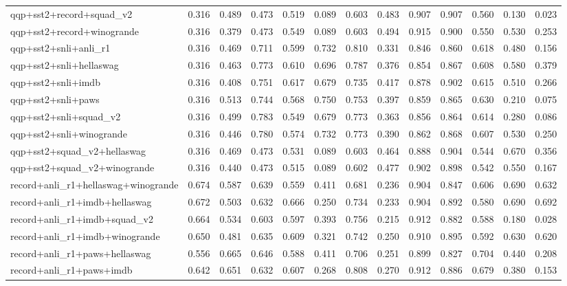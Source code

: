 \begin{table}[t]
\begin{tabular}{lrrrrrrrrrrrr}
    qqp+sst2+record+squad\_v2 & 0.316 & 0.489 & 0.473 & 0.519 & 0.089 & 0.603 & 0.483 & 0.907 & 0.907 & 0.560 & 0.130 & 0.023 \\
    qqp+sst2+record+winogrande & 0.316 & 0.379 & 0.473 & 0.549 & 0.089 & 0.603 & 0.494 & 0.915 & 0.900 & 0.550 & 0.530 & 0.253 \\
    qqp+sst2+snli+anli\_r1 & 0.316 & 0.469 & 0.711 & 0.599 & 0.732 & 0.810 & 0.331 & 0.846 & 0.860 & 0.618 & 0.480 & 0.156 \\
    qqp+sst2+snli+hellaswag & 0.316 & 0.463 & 0.773 & 0.610 & 0.696 & 0.787 & 0.376 & 0.854 & 0.867 & 0.608 & 0.580 & 0.379 \\
    qqp+sst2+snli+imdb & 0.316 & 0.408 & 0.751 & 0.617 & 0.679 & 0.735 & 0.417 & 0.878 & 0.902 & 0.615 & 0.510 & 0.266 \\
    qqp+sst2+snli+paws & 0.316 & 0.513 & 0.744 & 0.568 & 0.750 & 0.753 & 0.397 & 0.859 & 0.865 & 0.630 & 0.210 & 0.075 \\
    qqp+sst2+snli+squad\_v2 & 0.316 & 0.499 & 0.783 & 0.549 & 0.679 & 0.773 & 0.363 & 0.856 & 0.864 & 0.614 & 0.280 & 0.086 \\
    qqp+sst2+snli+winogrande & 0.316 & 0.446 & 0.780 & 0.574 & 0.732 & 0.773 & 0.390 & 0.862 & 0.868 & 0.607 & 0.530 & 0.250 \\
    qqp+sst2+squad\_v2+hellaswag & 0.316 & 0.469 & 0.473 & 0.531 & 0.089 & 0.603 & 0.464 & 0.888 & 0.904 & 0.544 & 0.670 & 0.356 \\
    qqp+sst2+squad\_v2+winogrande & 0.316 & 0.440 & 0.473 & 0.515 & 0.089 & 0.602 & 0.477 & 0.902 & 0.898 & 0.542 & 0.550 & 0.167 \\
    record+anli\_r1+hellaswag+winogrande & 0.674 & 0.587 & 0.639 & 0.559 & 0.411 & 0.681 & 0.236 & 0.904 & 0.847 & 0.606 & 0.690 & 0.632 \\
    record+anli\_r1+imdb+hellaswag & 0.672 & 0.503 & 0.632 & 0.666 & 0.250 & 0.734 & 0.233 & 0.904 & 0.892 & 0.580 & 0.690 & 0.692 \\
    record+anli\_r1+imdb+squad\_v2 & 0.664 & 0.534 & 0.603 & 0.597 & 0.393 & 0.756 & 0.215 & 0.912 & 0.882 & 0.588 & 0.180 & 0.028 \\
    record+anli\_r1+imdb+winogrande & 0.650 & 0.481 & 0.635 & 0.609 & 0.321 & 0.742 & 0.250 & 0.910 & 0.895 & 0.592 & 0.630 & 0.620 \\
    record+anli\_r1+paws+hellaswag & 0.556 & 0.665 & 0.646 & 0.588 & 0.411 & 0.706 & 0.251 & 0.899 & 0.827 & 0.704 & 0.440 & 0.208 \\
    record+anli\_r1+paws+imdb & 0.642 & 0.651 & 0.632 & 0.607 & 0.268 & 0.808 & 0.270 & 0.912 & 0.886 & 0.679 & 0.380 & 0.153 \\

\end{tabular}
\end{table}
